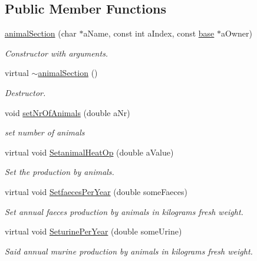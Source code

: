 \subsection*{Public Member Functions}
\begin{DoxyCompactItemize}
\item 
\hyperlink{classanimal_section_ad2bba0c526d7ebf4b5b7f7f70c9c330a}{animalSection} (char $\ast$aName, const int aIndex, const \hyperlink{classbase}{base} $\ast$aOwner)
\begin{DoxyCompactList}\small\item\em Constructor with arguments. \item\end{DoxyCompactList}\item 
virtual \hyperlink{classanimal_section_a5d0ec0377589de7afd16ae207e5a172e}{$\sim$animalSection} ()
\begin{DoxyCompactList}\small\item\em Destructor. \item\end{DoxyCompactList}\item 
void \hyperlink{classanimal_section_afeb3c65b7f3a7e96d71294a84ac68651}{setNrOfAnimals} (double aNr)
\begin{DoxyCompactList}\small\item\em set number of animals \item\end{DoxyCompactList}\item 
virtual void \hyperlink{classanimal_section_a89807aacadf08b582db9e9d6bc40fa16}{SetanimalHeatOp} (double aValue)
\begin{DoxyCompactList}\small\item\em Set the production by animals. \item\end{DoxyCompactList}\item 
virtual void \hyperlink{classanimal_section_a97192665631325ed05570268d9a332d3}{SetfaecesPerYear} (double someFaeces)
\begin{DoxyCompactList}\small\item\em Set annual faeces production by animals in kilograms fresh weight. \item\end{DoxyCompactList}\item 
virtual void \hyperlink{classanimal_section_ab571a85500e0c5454cd77b7787739d5f}{SeturinePerYear} (double someUrine)
\begin{DoxyCompactList}\small\item\em Said annual murine production by animals in kilograms fresh weight. \item\end{DoxyCompactList}\item 

\end{DoxyCompactItemize}
